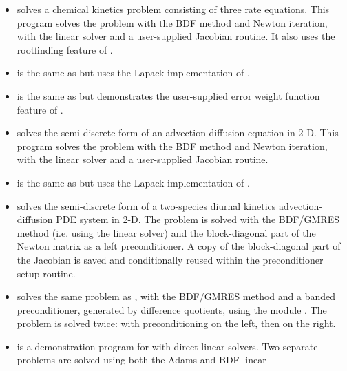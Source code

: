 \begin{itemize}


\item {}
  solves a chemical kinetics problem consisting of three rate equations.
  \newline
  This program solves the problem with the BDF method and Newton          
  iteration, with the {\cvdense} linear solver and a user-supplied    
  Jacobian routine.  It also uses the rootfinding feature of {\cvodes}.
\item {}
  is the same as  but uses the Lapack implementation of {\cvdense}.
\item {}
  is the same as  but demonstrates the user-supplied error
  weight function feature of {\cvodes}.
\item {}
  solves the semi-discrete form of an advection-diffusion equation in 2-D. 
  \newline
  This program solves the problem with the BDF method and Newton          
  iteration, with the {\cvband} linear solver and a user-supplied     
  Jacobian routine.
\item {}
  is the same as  but uses the Lapack implementation of {\cvband}.
\item {}
  solves the semi-discrete form of a two-species diurnal kinetics
  advection-diffusion PDE system in 2-D.
  \newline
  The problem is solved with the BDF/GMRES method (i.e.    
  using the {\cvspgmr} linear solver) and the block-diagonal part of the  
  Newton matrix as a left preconditioner. A copy of the block-diagonal 
  part of the Jacobian is saved and conditionally reused within the    
  preconditioner setup routine.
\item {}
  solves the same problem as , with the BDF/GMRES method 
  and a banded preconditioner, generated by difference quotients, 
  using the module {\cvbandpre}.
  \newline
  The problem is solved twice: with preconditioning on the left,
  then on the right.
\item {}
  is a demonstration program for {\cvodes} with direct linear solvers.
  \newline
  Two separate problems are solved using both the Adams and BDF linear

\end{itemize}
